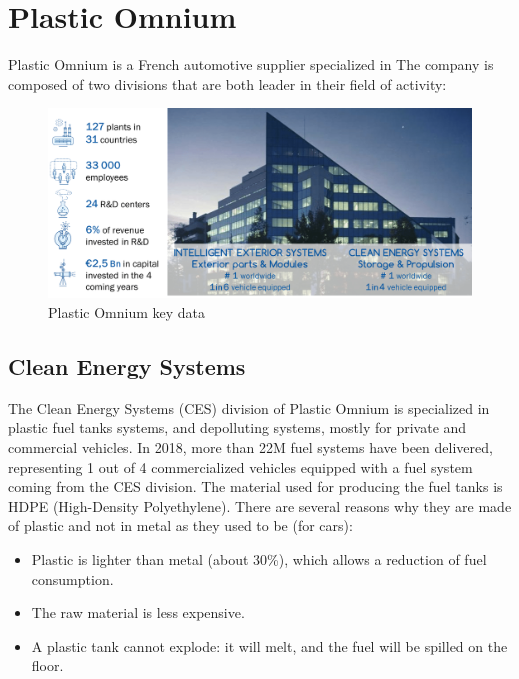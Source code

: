 \chapter{Plastic Omnium} \label{Plastic Omnium}

Plastic Omnium is a French automotive supplier specialized in 
The company is composed of two divisions that are both leader in their field of activity:


\begin{figure}
\centerline{\includegraphics[scale=0.5]{images/appendix_A/PO_key_data.png}}
\caption{Plastic Omnium key data}
\label{fig:Plastic Omnium key data}
\end{figure}




\section{Clean Energy Systems}

The Clean Energy Systems (CES) division of Plastic Omnium is specialized in plastic fuel tanks systems, and depolluting systems, mostly for private and commercial vehicles. In 2018, more than 22M fuel systems have been delivered, representing 1 out of 4 commercialized vehicles equipped with a fuel system coming from the CES division.
The material used for producing the fuel tanks is HDPE (High-Density Polyethylene). There are several reasons why they are made of plastic and not in metal as they used to be (for cars):
\begin{itemize}
    \item Plastic is lighter than metal (about 30\%), which allows a reduction of fuel consumption.
    \item The raw material is less expensive.
    \item A plastic tank cannot explode: it will melt, and the fuel will be spilled on the floor.
\end{itemize}

